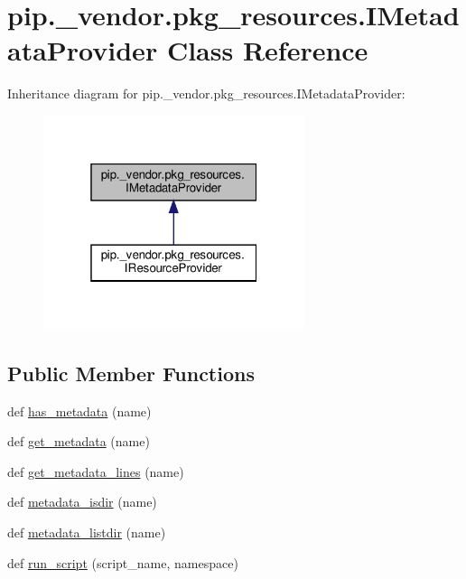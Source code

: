 \hypertarget{classpip_1_1__vendor_1_1pkg__resources_1_1IMetadataProvider}{}\section{pip.\+\_\+vendor.\+pkg\+\_\+resources.\+I\+Metadata\+Provider Class Reference}
\label{classpip_1_1__vendor_1_1pkg__resources_1_1IMetadataProvider}


Inheritance diagram for pip.\+\_\+vendor.\+pkg\+\_\+resources.\+I\+Metadata\+Provider\+:
\nopagebreak
\begin{figure}[H]
\begin{center}
\leavevmode
\includegraphics[width=217pt]{classpip_1_1__vendor_1_1pkg__resources_1_1IMetadataProvider__inherit__graph}
\end{center}
\end{figure}
\subsection*{Public Member Functions}
\begin{DoxyCompactItemize}
\item 
def \hyperlink{classpip_1_1__vendor_1_1pkg__resources_1_1IMetadataProvider_ac277b014eec87bcbd03b3952f77ff5fd}{has\+\_\+metadata} (name)
\item 
def \hyperlink{classpip_1_1__vendor_1_1pkg__resources_1_1IMetadataProvider_aa3de5cdf5527ea8371939280569fcdff}{get\+\_\+metadata} (name)
\item 
def \hyperlink{classpip_1_1__vendor_1_1pkg__resources_1_1IMetadataProvider_a2b8ae188c3af210fd6d0a1e38e78d59d}{get\+\_\+metadata\+\_\+lines} (name)
\item 
def \hyperlink{classpip_1_1__vendor_1_1pkg__resources_1_1IMetadataProvider_ac1ec75d35c9156353e370482aed10f11}{metadata\+\_\+isdir} (name)
\item 
def \hyperlink{classpip_1_1__vendor_1_1pkg__resources_1_1IMetadataProvider_ad3a0ac7e88a3cfaa1df6fe772aa09c03}{metadata\+\_\+listdir} (name)
\item 
def \hyperlink{classpip_1_1__vendor_1_1pkg__resources_1_1IMetadataProvider_a736e581ab47751623d0f65d74f4aa764}{run\+\_\+script} (script\+\_\+name, namespace)
\end{DoxyCompactItemize}



